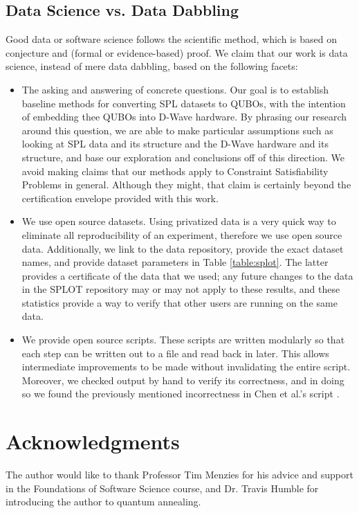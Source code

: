 \documentclass{sig-alternate-05-2015}
\begin{document}
\subsection{Data Science vs. Data Dabbling}

Good data or software science follows the scientific method, which is based on conjecture and (formal or evidence-based) proof. We claim that our work is data science, instead of mere data dabbling, based on the following facets:

\begin{itemize}
\item The asking and answering of concrete questions. Our goal is to establish baseline methods for converting SPL datasets to QUBOs, with the intention of embedding thee QUBOs into D-Wave hardware. By phrasing our research around this question, we are able to make particular assumptions such as looking at SPL data and its structure and the D-Wave hardware and its structure, and base our exploration and conclusions off of this direction. We avoid making claims that our methods apply to Constraint Satisfiability Problems in general. Although they might, that claim is certainly beyond the certification envelope provided with this work.
\item We use open source datasets. Using privatized data is a very quick way to eliminate all reproducibility of an experiment, therefore we use open source data. Additionally, we link to the data repository, provide the exact dataset names, and provide dataset parameters in Table \ref{table:splot}. The latter provides a certificate of the data that we used; any future changes to the data in the SPLOT repository may or may not apply to these results, and these statistics provide a way to verify that other users are running on the same data.
\item We provide open source scripts. These scripts are written modularly so that each step can be written out to a file and read back in later. This allows intermediate improvements to be made without invalidating the entire script. Moreover, we checked output by hand to verify its correctness, and in doing so we found the previously mentioned incorrectness in Chen et al.'s script \cite{chen2016sampling}.
\end{itemize}


\section{Acknowledgments}
The author would like to thank Professor Tim Menzies for his advice and support in the Foundations of Software Science course, and Dr. Travis Humble for introducing the author to quantum annealing.

\newpage

\end{document}
